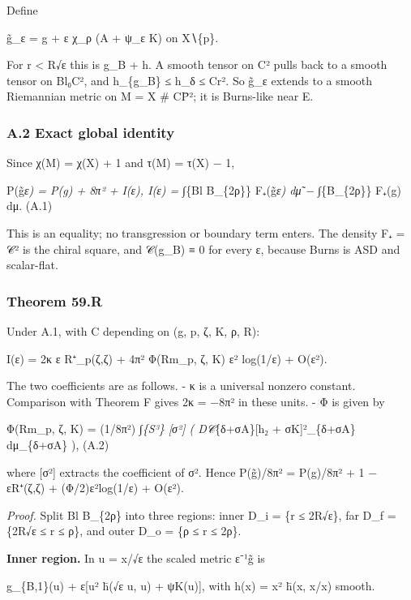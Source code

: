 \documentclass[
  10pt,
]{report}
\begin{document}
Define

g̃\_ε = g + ε χ\_ρ (A + ψ\_ε K) on X∖\{p\}.

For r \textless{} R√ε this is g\_B + h. A smooth tensor on C² pulls back
to a smooth tensor on Bl₀C², and \textbar h\textbar\_\{g\_B\} ≤
\textbar h\textbar\_δ ≤ Cr². So g̃\_ε extends to a smooth Riemannian
metric on M = X \# CP̄²; it is Burns-like near E.

\hypertarget{a.2-exact-global-identity}{%
\subsubsection{A.2 Exact global
identity}\label{a.2-exact-global-identity}}

Since χ(M) = χ(X) + 1 and τ(M) = τ(X) − 1,

P(g̃\emph{ε) = P(g) + 8π² + I(ε), I(ε) = ∫}\{Bl B\_\{2ρ\}\} F₊(g̃\emph{ε)
dμ̃ − ∫}\{B\_\{2ρ\}\} F₊(g) dμ. (A.1)

This is an equality; no transgression or boundary term enters. The
density F₊ = \textbar 𝒞\textbar² is the chiral square, and 𝒞(g\_B) ≡ 0
for every ε, because Burns is ASD and scalar-flat.

\hypertarget{theorem-59.r}{%
\subsubsection{Theorem 59.R}\label{theorem-59.r}}

Under A.1, with C depending on (g, p, ζ, K, ρ, R):

I(ε) = 2κ ε R⁺\_p(ζ,ζ) + 4π² Φ(Rm\_p, ζ, K) ε² log(1/ε) + O(ε²).

The two coefficients are as follows. - κ is a universal nonzero
constant. Comparison with Theorem F gives 2κ = −8π² in these units. - Φ
is given by

Φ(Rm\_p, ζ, K) = (1/8π²) ∫\emph{\{S³\} {[}σ²{]} (
\textbar D𝒞}\{δ+σA\}{[}h₂ + σK{]}\textbar²\_\{δ+σA\} dμ\_\{δ+σA\} ),
(A.2)

where {[}σ²{]} extracts the coefficient of σ². Hence P(g̃)/8π² = P(g)/8π²
+ 1 − εR⁺(ζ,ζ) + (Φ/2)ε²log(1/ε) + O(ε²).

\emph{Proof.} Split Bl B\_\{2ρ\} into three regions: inner D\_i = \{r ≤
2R√ε\}, far D\_f = \{2R√ε ≤ r ≤ ρ\}, and outer D\_o = \{ρ ≤ r ≤ 2ρ\}.

\textbf{Inner region.} In u = x/√ε the scaled metric ε⁻¹g̃ is

g\_\{B,1\}(u) + ε{[}\textbar u\textbar² h̄(√ε u, u) + ψK(u){]}, with h(x)
= \textbar x\textbar² h̄(x, x/\textbar x\textbar) smooth.
\end{document}
